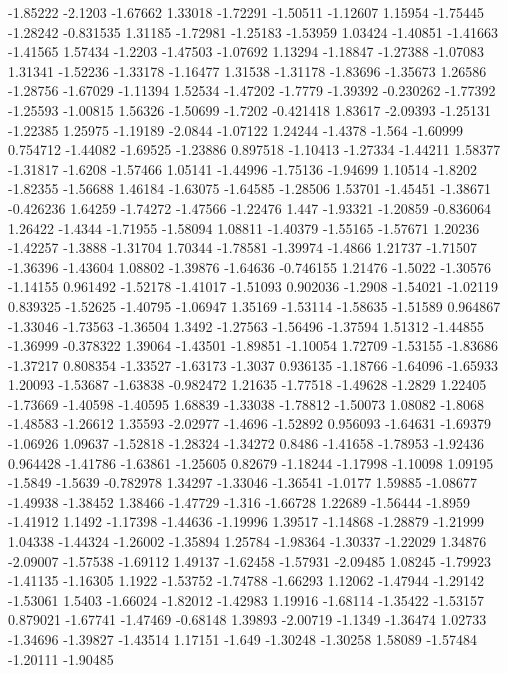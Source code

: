 \documentclass[9pt]{article}
\theoremstyle{plain}
\theoremstyle{definition}
\theoremstyle{remark}
\numberwithin{equation}{section}
\begin{document}
-1.85222
-2.1203
-1.67662
1.33018
-1.72291
-1.50511
-1.12607
1.15954
-1.75445
-1.28242
-0.831535
1.31185
-1.72981
-1.25183
-1.53959
1.03424
-1.40851
-1.41663
-1.41565
1.57434
-1.2203
-1.47503
-1.07692
1.13294
-1.18847
-1.27388
-1.07083
1.31341
-1.52236
-1.33178
-1.16477
1.31538
-1.31178
-1.83696
-1.35673
1.26586
-1.28756
-1.67029
-1.11394
1.52534
-1.47202
-1.7779
-1.39392
-0.230262
-1.77392
-1.25593
-1.00815
1.56326
-1.50699
-1.7202
-0.421418
1.83617
-2.09393
-1.25131
-1.22385
1.25975
-1.19189
-2.0844
-1.07122
1.24244
-1.4378
-1.564
-1.60999
0.754712
-1.44082
-1.69525
-1.23886
0.897518
-1.10413
-1.27334
-1.44211
1.58377
-1.31817
-1.6208
-1.57466
1.05141
-1.44996
-1.75136
-1.94699
1.10514
-1.8202
-1.82355
-1.56688
1.46184
-1.63075
-1.64585
-1.28506
1.53701
-1.45451
-1.38671
-0.426236
1.64259
-1.74272
-1.47566
-1.22476
1.447
-1.93321
-1.20859
-0.836064
1.26422
-1.4344
-1.71955
-1.58094
1.08811
-1.40379
-1.55165
-1.57671
1.20236
-1.42257
-1.3888
-1.31704
1.70344
-1.78581
-1.39974
-1.4866
1.21737
-1.71507
-1.36396
-1.43604
1.08802
-1.39876
-1.64636
-0.746155
1.21476
-1.5022
-1.30576
-1.14155
0.961492
-1.52178
-1.41017
-1.51093
0.902036
-1.2908
-1.54021
-1.02119
0.839325
-1.52625
-1.40795
-1.06947
1.35169
-1.53114
-1.58635
-1.51589
0.964867
-1.33046
-1.73563
-1.36504
1.3492
-1.27563
-1.56496
-1.37594
1.51312
-1.44855
-1.36999
-0.378322
1.39064
-1.43501
-1.89851
-1.10054
1.72709
-1.53155
-1.83686
-1.37217
0.808354
-1.33527
-1.63173
-1.3037
0.936135
-1.18766
-1.64096
-1.65933
1.20093
-1.53687
-1.63838
-0.982472
1.21635
-1.77518
-1.49628
-1.2829
1.22405
-1.73669
-1.40598
-1.40595
1.68839
-1.33038
-1.78812
-1.50073
1.08082
-1.8068
-1.48583
-1.26612
1.35593
-2.02977
-1.4696
-1.52892
0.956093
-1.64631
-1.69379
-1.06926
1.09637
-1.52818
-1.28324
-1.34272
0.8486
-1.41658
-1.78953
-1.92436
0.964428
-1.41786
-1.63861
-1.25605
0.82679
-1.18244
-1.17998
-1.10098
1.09195
-1.5849
-1.5639
-0.782978
1.34297
-1.33046
-1.36541
-1.0177
1.59885
-1.08677
-1.49938
-1.38452
1.38466
-1.47729
-1.316
-1.66728
1.22689
-1.56444
-1.8959
-1.41912
1.1492
-1.17398
-1.44636
-1.19996
1.39517
-1.14868
-1.28879
-1.21999
1.04338
-1.44324
-1.26002
-1.35894
1.25784
-1.98364
-1.30337
-1.22029
1.34876
-2.09007
-1.57538
-1.69112
1.49137
-1.62458
-1.57931
-2.09485
1.08245
-1.79923
-1.41135
-1.16305
1.1922
-1.53752
-1.74788
-1.66293
1.12062
-1.47944
-1.29142
-1.53061
1.5403
-1.66024
-1.82012
-1.42983
1.19916
-1.68114
-1.35422
-1.53157
0.879021
-1.67741
-1.47469
-0.68148
1.39893
-2.00719
-1.1349
-1.36474
1.02733
-1.34696
-1.39827
-1.43514
1.17151
-1.649
-1.30248
-1.30258
1.58089
-1.57484
-1.20111
-1.90485
\end{document}
